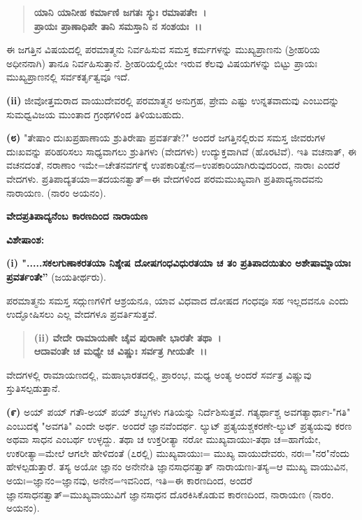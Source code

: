 \begin{verse}
\textbf{ಯಾನಿ ಯಾನೀಹ ಕರ್ಮಾಣಿ ಜಗತಃ ಸ್ಯುಃ ರಮಾಪತೇಃ~।}\\\textbf{ಪ್ರಾಯಃ ಪ್ರಾಣಾಧಿಪೇ ತಾನಿ ಸಮಸ್ತಾನಿ ನ ಸಂಶಯಃ~।।}
\end{verse}


ಈ ಜಗತ್ತಿನ ವಿಷಯದಲ್ಲಿ ಪರಮಾತ್ಮನು ನಿರ್ವಹಿಸುವ ಸಮಸ್ತ ಕರ್ಮಗಳನ್ನು ಮುಖ್ಯ\-ಪ್ರಾಣನು (ಶ‍್ರೀಹರಿಯ ಅಧೀನನಾಗಿ) ತಾನೂ ನಿರ್ವಹಿಸುತ್ತಾನೆ. ಶ‍್ರೀಹರಿಯಲ್ಲಿಯೇ ಇರುವ ಕೆಲವು ವಿಷಯಗಳನ್ನು ಬಿಟ್ಟು ಪ್ರಾಯಃ ಮುಖ್ಯಪ್ರಾಣನಲ್ಲಿ ಸರ್ವಕರ್ತೃತ್ವವೂ ಇದೆ.

\textbf{(ii)} ಜೀವೋತ್ತಮರಾದ ವಾಯುದೇವರಲ್ಲಿ ಪರಮಾತ್ಮನ ಅನುಗ್ರಹ, ಪ್ರೇಮ ಎಷ್ಟು ಉನ್ನತವಾದುವು ಎಂಬುದನ್ನು ಸುಮಧ್ವವಿಜಯ ಮುಂತಾದ ಗ್ರಂಥಗಳಿಂದ ತಿಳಿಯಬಹುದು.

\textbf{(೮)} "ತೇಷಾಂ ದುಃಖಪ್ರಹಾಣಾಯ ಶ್ರುತಿರೇಷಾ ಪ್ರವರ್ತತೇ?" ಅಂದರೆ ಜಗತ್ತಿನಲ್ಲಿರುವ ಸಮಸ್ತ ಜೀವರುಗಳ ದುಃಖವನ್ನು ಪರಿಹರಿಸಲು ಸಾಧ್ಯವಾಗಲು ಶ್ರುತಿಗಳು (ವೇದಗಳು) ಉದ್ಯುಕ್ತವಾಗಿವೆ (ಹೊರಟಿವೆ). ಇತಿ ವಚನಾತ್, ಈ ವಚನದಂತೆ, ನರಾಣಾಂ ಇಮೇ=ಚೇತನವರ್ಗಕ್ಕೆ ಉಪಕಾರಿತ್ವೇನ=ಉಪಕಾರಿಯಾಗಿರುವುದರಿಂದ, ನಾರಾಃ ಎಂದರೆ ವೇದಗಳು. ಪ್ರತಿಪಾದ್ಯತಯಾ=ತದಯನತ್ವಾತ್=ಈ ವೇದಗಳಿಂದ ಪರಮಮುಖ್ಯವಾಗಿ ಪ್ರತಿಪಾದ್ಯನಾದವನು ನಾರಾಯಣ. (ನಾರಂ ಅಯನಂ).

\begin{center}
\textbf{ವೇದಪ್ರತಿಪಾದ್ಯನೆಂಬ ಕಾರಣದಿಂದ ನಾರಾಯಣ}
\end{center}

\noindent
\textbf{ವಿಶೇಷಾಂಶ:\enginline{-}}

\textbf{(i) ".....ಸಕಲಗುಣಾಕರತಯಾ ನಿಶ್ಶೇಷ ದೋಷಗಂಧವಿಧುರತಯಾ ಚ ತಂ ಪ್ರತಿಪಾದಯಿತುಂ ಅಶೇಷಾಮ್ನಾಯಾಃ ಪ್ರವರ್ತಂತೇ”} (ಜಯತೀರ್ಥರು).

ಪರಮಾತ್ಮನು ಸಮಸ್ತ ಸದ್ಗುಣಗಳಿಗೆ ಆಶ್ರಯನೂ, ಯಾವ ವಿಧವಾದ ದೋಷದ ಗಂಧವೂ ಸಹ ಇಲ್ಲದವನೂ ಎಂದು ಉದ್ಘೋಷಿಸಲು ಎಲ್ಲ ವೇದಗಳೂ ಪ್ರವರ್ತಿಸುತ್ತವೆ.

\begin{verse}
\textbf{(ii) ವೇದೇ ರಾಮಾಯಣೇ ಚೈವ ಪುರಾಣೇ ಭಾರತೇ ತಥಾ~।}\\\textbf{ಆದಾವಂತೇ ಚ ಮಧ್ಯೇ ಚ ವಿಷ್ಣುಃ ಸರ್ವತ್ರ ಗೀಯತೇ~।।}
\end{verse}


ವೇದಗಳಲ್ಲಿ ರಾಮಾಯಣದಲ್ಲಿ, ಮಹಾಭಾರತದಲ್ಲಿ, ಪ್ರಾರಂಭ, ಮಧ್ಯ ಅಂತ್ಯ ಅಂದರೆ ಸರ್ವತ್ರ ವಿಷ್ಣುವು ಸ್ತುತಿಸಲ್ಪಡುತ್ತಾನೆ.

\textbf{(೯)} ಅಯ್ ಪಯ್ ಗತೌ-ಅಯ್ ಪಯ್ ಶಬ್ದಗಳು ಗತಿಯನ್ನು ನಿರ್ದೆಶಿಸುತ್ತವೆ. ಗತ್ಯರ್ಥಾಶ್ಚ ಅವಗತ್ಯಾರ್ಥಾಃ-"ಗತಿ" ಎಂಬುದಕ್ಕೆ "ಅವಗತಿ" ಎಂದೇ ಅರ್ಥ. ಅಂದರೆ ಜ್ಞಾನವೆಂದರ್ಥ. ಲ್ಯುಟ್ ಪ್ರತ್ಯಯಶ್ಚಕರಣೇ-ಲ್ಯುಟ್ ಪ್ರತ್ಯಯವು ಕರಣ ಅಥವಾ ಸಾಧನ ಎಂಬರ್ಥ ಉಳ್ಳದ್ದು. ತಥಾ ಚ ಉಕ್ತರೀತ್ಯಾ ನರೋ ಮುಖ್ಯವಾಯುಃ-ತಥಾ ಚ=ಹಾಗೆಯೇ, ಉಕರೀತ್ಯಾ=ಮೇಲೆ ಆಗಲೇ ಹೇಳಿದಂತೆ (೭ರಲ್ಲಿ) ಮುಖ್ಯವಾಯುಃ= ಮುಖ್ಯ ವಾಯುದೇವರು, ನರಃ="ನರ"ನೆಂದು ಹೇಳಲ್ಪಡುತ್ತಾರೆ. ತಸ್ಯ ಅಯೋ ಜ್ಞಾನಂ ಅನೇನೇತಿ ಜ್ಞಾನಸಾಧನತ್ವಾತ್ ನಾರಾಯಣಃ-ತಸ್ಯ=ಆ ಮುಖ್ಯ ವಾಯುವಿನ, ಅಯಃ=ಜ್ಞಾನಂ=ಜ್ಞಾನವು, ಅನೇನ=ಇವನಿಂದ, ಇತಿ=ಈ ಕಾರಣದಿಂದ, ಅಂದರೆ ಜ್ಞಾನಸಾಧನತ್ವಾತ್=ಮುಖ್ಯವಾಯು\-ವಿಗೆ ಜ್ಞಾನಸಾಧನ ದೊರಕಿಸಿಕೊಡುವ ಕಾರಣದಿಂದ, ನಾರಾಯಣ (ನಾರಂ. ಅಯನಂ).

